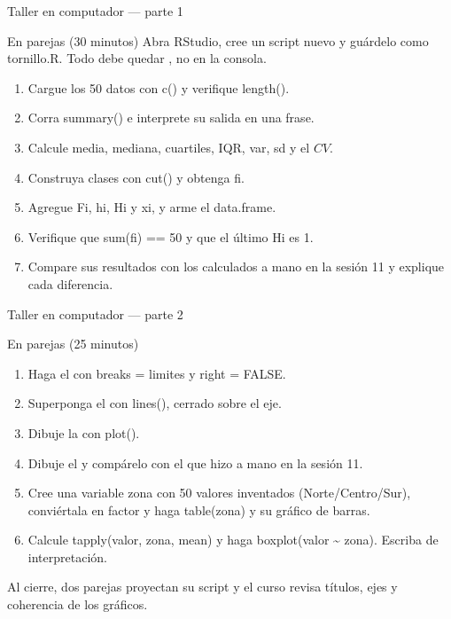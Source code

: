 \documentclass[aspectratio=169,10pt]{beamer}
\newcommand{\fx}[1]{{\ttfamily\color{uniAzul}#1}}
\begin{document}
\begin{frame}{Taller en computador — parte 1}
  \begin{alertblock}{En parejas (30 minutos)}
    \scriptsize
    Abra RStudio, cree un script nuevo y guárdelo como
    \fx{tornillo.R}. Todo debe quedar , no en la
    consola.

    \vspace{0.2cm}
    \begin{enumerate}\setlength{\itemsep}{-0.07cm}
      \item Cargue los 50 datos con \fx{c()} y verifique \fx{length()}.
      \item Corra \fx{summary()} e interprete su salida en una frase.
      \item Calcule media, mediana, cuartiles, \fx{IQR}, \fx{var}, \fx{sd} y el
            $CV$.
      \item Construya \fx{clases} con \fx{cut()} y obtenga \fx{fi}.
      \item Agregue \fx{Fi}, \fx{hi}, \fx{Hi} y \fx{xi}, y arme el
            \fx{data.frame}.
      \item Verifique que \fx{sum(fi) == 50} y que el último \fx{Hi} es 1.
      \item Compare sus resultados con los calculados a mano en la sesión 11 y
            explique cada diferencia.
    \end{enumerate}
  \end{alertblock}
\end{frame}

\begin{frame}{Taller en computador — parte 2}
  \begin{alertblock}{En parejas (25 minutos)}
    \scriptsize
    \begin{enumerate}\setlength{\itemsep}{-0.07cm}
      \item Haga el  con \fx{breaks = limites} y
            \fx{right = FALSE}.
      \item Superponga el  con \fx{lines()}, cerrado sobre el
            eje.
      \item Dibuje la  con \fx{plot()}.
      \item Dibuje el  y compárelo con el que hizo a
            mano en la sesión 11.
      \item Cree una variable \fx{zona} con 50 valores inventados
            (Norte/Centro/Sur), conviértala en \fx{factor} y haga
            \fx{table(zona)} y su gráfico de barras.
      \item Calcule \fx{tapply(valor, zona, mean)} y haga
            \fx{boxplot(valor \~{} zona)}. Escriba  de
            interpretación.
    \end{enumerate}

    \vspace{0.1cm}
    Al cierre, dos parejas proyectan su script y el curso revisa títulos, ejes
    y coherencia de los gráficos.
  \end{alertblock}
\end{frame}
\end{document}
